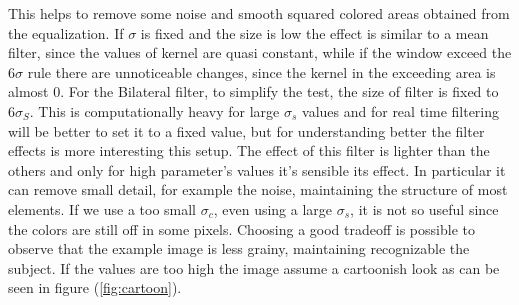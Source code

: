 \documentclass[11pt,a4paper]{article}
\begin{document}
This helps to remove some noise and smooth squared colored areas obtained from the equalization.
If $\sigma$ is fixed and the size is low the effect is similar to a mean filter, since the values of kernel are quasi constant, while if the window exceed the 6$\sigma$ rule there are unnoticeable changes, since the kernel in the exceeding area is almost 0.\newline
For the Bilateral filter, to simplify the test, the size of filter is fixed to $6\sigma_{S}$. This is computationally heavy for large $\sigma_s$ values and for real time filtering will be better to set it to a fixed value, but for understanding better the filter effects is more interesting this setup.
The effect of this filter is lighter than the others and only for high parameter's values it's sensible its effect.
In particular it can remove small detail, for example the noise, maintaining the structure of most elements.
If we use a too small $\sigma_c$, even using a large $\sigma_s$, it is not so useful since the colors are still off in some pixels.
Choosing a good tradeoff is possible to observe that the example image is less grainy, maintaining recognizable the subject.
If the values are too high the image assume a cartoonish look as can be seen in figure (\ref{fig:cartoon}).
\end{document}
